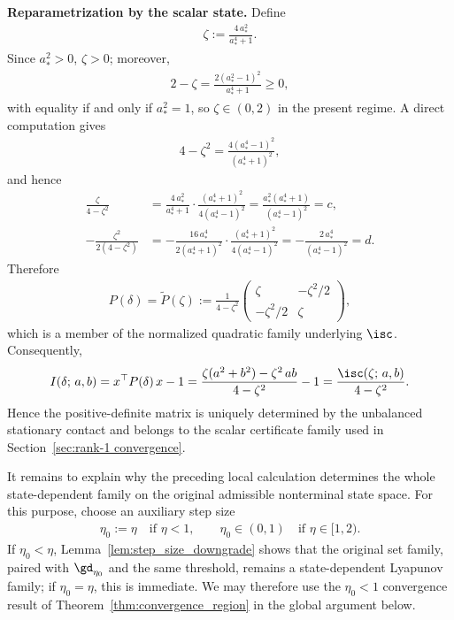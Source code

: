 \documentclass{article}
\begin{document}
\textbf{Reparametrization by the scalar state.}
Define
\begin{align}
    \zeta := \frac{4\, a_*^2}{a_*^4 + 1}.
    \label{eq:appendix_zeta_from_astar}
\end{align}
Since $a_*^2 > 0$, $\zeta > 0$; moreover,
\begin{align}
    2 - \zeta
    = \frac{2(a_*^2 - 1)^2}{a_*^4 + 1} \ge 0,
\end{align}
with equality if and only if $a_*^2 = 1$, so $\zeta \in (0, 2)$ in the
present regime. A direct computation gives
\begin{align}
    4 - \zeta^2 = \frac{4(a_*^4 - 1)^2}{(a_*^4 + 1)^2},
\end{align}
and hence
\begin{align}
    \frac{\zeta}{4 - \zeta^2}
    &= \frac{4\, a_*^2}{a_*^4 + 1}
       \cdot
       \frac{(a_*^4 + 1)^2}{4(a_*^4 - 1)^2}
    = \frac{a_*^2(a_*^4 + 1)}{(a_*^4 - 1)^2}
    = c,
    \\
    -\frac{\zeta^2}{2(4 - \zeta^2)}
    &= -\frac{16\, a_*^4}{2(a_*^4 + 1)^2}
       \cdot
       \frac{(a_*^4 + 1)^2}{4(a_*^4 - 1)^2}
    = -\frac{2\, a_*^4}{(a_*^4 - 1)^2}
    = d.
\end{align}
Therefore
\begin{align}\label{eq:unique_P}
    P(\delta)
    = \widetilde P(\zeta)
    :=
    \frac{1}{4 - \zeta^2}
    \begin{pmatrix}
        \zeta & -\zeta^2/2 \\
        -\zeta^2/2 & \zeta
    \end{pmatrix},
\end{align}
which is a member of the normalized quadratic family underlying $\isc$.
Consequently,
\begin{align}
    I(\delta;\, a, b)
    = x^\top P(\delta)\, x - 1
    = \frac{\zeta(a^2 + b^2) - \zeta^2\, ab}{4 - \zeta^2} - 1
    = \frac{\isc(\zeta;\,a,b)}{4-\zeta^2}.
\end{align}
Hence the positive-definite matrix is uniquely determined by the unbalanced
stationary contact and belongs to the scalar certificate family used in
Section~\ref{sec:rank-1 convergence}.

It remains to explain why the preceding local calculation determines the
whole state-dependent family on the original admissible nonterminal state
space.  For this purpose, choose an auxiliary step size
\begin{align}
    \eta_0:=\eta \quad\text{if }\eta<1,
    \qquad
    \eta_0\in(0,1) \quad\text{if }\eta\in[1,2).
\end{align}
If $\eta_0<\eta$, Lemma~\ref{lem:step_size_downgrade} shows that the original
set family, paired with $\gd_{\eta_0}$ and the same threshold, remains a
state-dependent Lyapunov family; if $\eta_0=\eta$, this is immediate. We may
therefore use the $\eta_0<1$ convergence result of
Theorem~\ref{thm:convergence_region} in the global argument below.
\end{document}
